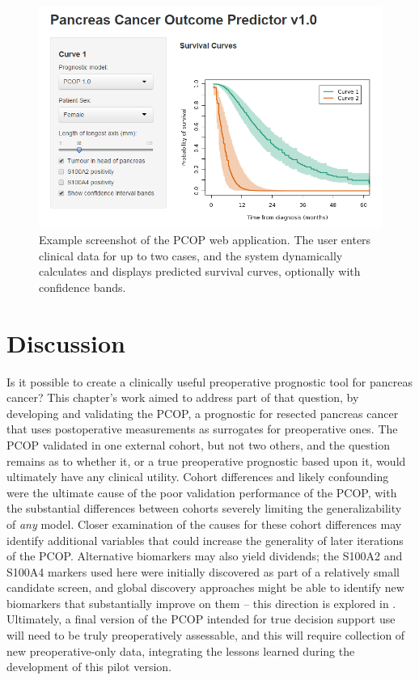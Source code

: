\documentclass[dissertation.tex]{subfiles}
\begin{document}
\begin{figure}
\centering
  \includegraphics[width=1\linewidth]{analysis/nomogram/webapp/PCOP.png}
\caption[Example screenshot of the \texorpdfstring{\acrshort{PCOP}}{PCOP} web application]{Example screenshot of the \gls{PCOP} web application.  The user enters clinical data for up to two cases, and the system dynamically calculates and displays predicted survival curves, optionally with confidence bands.}
\label{fig:nomo-web-example}
\end{figure}

\section{Discussion}
Is it possible to create a clinically useful preoperative prognostic tool for pancreas cancer?  This chapter's work aimed to address part of that question, by developing and validating the \gls{PCOP}, a prognostic for resected pancreas cancer that uses postoperative measurements as surrogates for preoperative ones.  The \gls{PCOP} validated in one external cohort, but not two others, and the question remains as to whether it, or a true preoperative prognostic based upon it, would ultimately have any clinical utility.  Cohort differences and likely confounding were the ultimate cause of the poor validation performance of the \gls{PCOP}, with the substantial differences between cohorts severely limiting the generalizability of \emph{any} model.  Closer examination of the causes for these cohort differences may identify additional variables that could increase the generality of later iterations of the \gls{PCOP}.  Alternative biomarkers may also yield dividends; the S100A2 and S100A4 markers used here were initially discovered as part of a relatively small candidate screen, and global discovery approaches might be able to identify new biomarkers that substantially improve on them -- this direction is explored in .  Ultimately, a final version of the \gls{PCOP} intended for true decision support use will need to be truly preoperatively assessable, and this will require collection of new preoperative-only data, integrating the lessons learned during the development of this pilot version.
\end{document}
